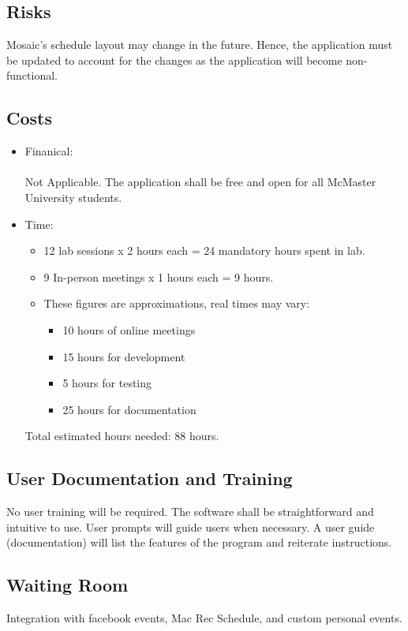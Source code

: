 \documentclass[12pt, titlepage]{article}
\begin{document}
\subsection{Risks}
\hspace{5mm}
Mosaic's schedule layout may change in the future. Hence, the application must be updated to account for the changes as the application will become non-functional.

\subsection{Costs}
\begin{itemize}
\item Finanical:\\
\\
Not Applicable. The application shall be free and open for all McMaster University students. 
		
\item Time:
\begin{itemize}
\item 12 lab sessions x 2 hours each = 24 mandatory hours spent in lab.
\item 9 In-person meetings x 1 hours each = 9 hours.
\item These figures are approximations, real times may vary:
\begin{itemize}
\item 10 hours of online meetings
\item 15 hours for development
\item 5 hours for testing
\item 25 hours for documentation
\end{itemize}

\end{itemize}

Total estimated hours needed: 88 hours.

\end{itemize}

\subsection{User Documentation and Training}
\hspace{5mm}
No user training will be required. The software shall be straightforward and intuitive to use. User prompts will guide users when necessary. A user guide (documentation) will list the features of the program and reiterate instructions. 
\subsection{Waiting Room}
\hspace{5mm}
Integration with facebook events, Mac Rec Schedule, and custom personal events. 
\end{document}
